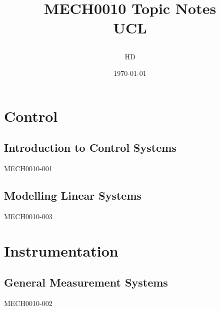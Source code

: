 \documentclass[12pt,a4paper, twoside]{report}
\begin{document}
\title{
  {MECH0010 Topic Notes}\\
  {\large UCL}
  \author{HD}
  \date{\today}
}
\maketitle
\tableofcontents
\part{Control}
\chapter{Introduction to Control Systems}
{MECH0010-001}
\chapter{Modelling Linear Systems}
{MECH0010-003}
\part{Instrumentation}
\chapter{General Measurement Systems}
{MECH0010-002}
\end{document}
